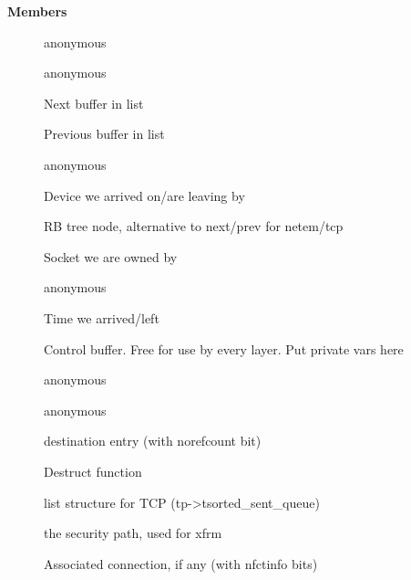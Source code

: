 \documentclass[a4paper,8pt,english]{sphinxmanual}
\begin{document}
\textbf{Members}
\begin{description}
\item[{}] \leavevmode
anonymous

\item[{}] \leavevmode
anonymous

\item[{}] \leavevmode
Next buffer in list

\item[{}] \leavevmode
Previous buffer in list

\item[{}] \leavevmode
anonymous

\item[{}] \leavevmode
Device we arrived on/are leaving by

\item[{}] \leavevmode
RB tree node, alternative to next/prev for netem/tcp

\item[{}] \leavevmode
Socket we are owned by

\item[{}] \leavevmode
anonymous

\item[{}] \leavevmode
Time we arrived/left

\item[{}] \leavevmode
Control buffer. Free for use by every layer. Put private vars here

\item[{}] \leavevmode
anonymous

\item[{}] \leavevmode
anonymous

\item[{}] \leavevmode
destination entry (with norefcount bit)

\item[{}] \leavevmode
Destruct function

\item[{}] \leavevmode
list structure for TCP (tp-\textgreater{}tsorted\_sent\_queue)

\item[{}] \leavevmode
the security path, used for xfrm

\item[{}] \leavevmode
Associated connection, if any (with nfctinfo bits)


\end{description}
\end{document}
